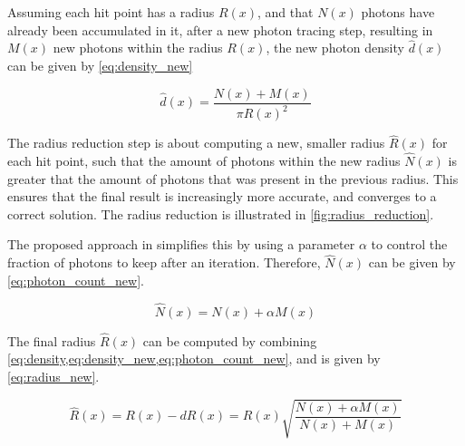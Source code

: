 \documentclass[main.tex]{subfiles}
\begin{document}
Assuming each hit point has a radius $R(x)$, and that $N(x)$ photons have already been accumulated in it, after a new photon tracing step, resulting in $M(x)$ new photons within the radius $R(x)$, the new photon density $\hat{d}(x)$ can be given by \cref{eq:density_new}

\begin{figure}[!htp]
  \begin{equation}
    \hat{d}(x) = \frac{N(x) + M(x)}{\pi R(x)^{2}}
  \label{eq:density_new}
  \end{equation}
\end{figure}

The radius reduction step is about computing a new, smaller radius $\hat{R}(x)$ for each hit point, such that the amount of photons within the new radius $\hat{N}(x)$ is greater that the amount of photons that was present in the previous radius. This ensures that the final result is increasingly more accurate, and converges to a correct solution. The radius reduction is illustrated in \cref{fig:radius_reduction}.

The proposed approach in \cite{hachisuka2008progressive} simplifies this by using a parameter $\alpha$ to control the fraction of photons to keep after an iteration. Therefore, $\hat{N}(x)$ can be given by \cref{eq:photon_count_new}.

\begin{figure}[!htp]
  \begin{equation}
    \hat{N}(x) = N(x) + \alpha M(x)
  \label{eq:photon_count_new}
  \end{equation}
\end{figure}



The final radius $\hat{R}(x)$ can be computed by combining \cref{eq:density,eq:density_new,eq:photon_count_new}, and is given by \cref{eq:radius_new}.

\begin{figure}[!htp]
  \begin{equation}
    \hat{R}(x) = R(x) - dR(x) = R(x) \sqrt{\frac{N(x) + \alpha M(x)}{N(x) + M(x)}}
  \label{eq:radius_new}
  \end{equation}
\end{figure}
\end{document}
